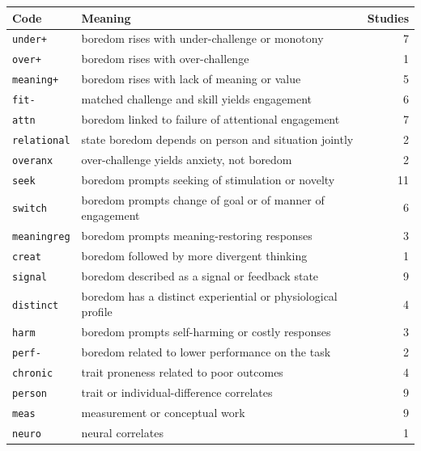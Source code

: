 \begin{center}\small
\begin{tabular}{@{}llr@{}}\toprule
Code & Meaning & Studies \\ \midrule
\texttt{under+} & boredom rises with under-challenge or monotony & 7 \\
\texttt{over+} & boredom rises with over-challenge & 1 \\
\texttt{meaning+} & boredom rises with lack of meaning or value & 5 \\
\texttt{fit-} & matched challenge and skill yields engagement & 6 \\
\texttt{attn} & boredom linked to failure of attentional engagement & 7 \\
\texttt{relational} & state boredom depends on person and situation jointly & 2 \\
\texttt{overanx} & over-challenge yields anxiety, not boredom & 2 \\
\texttt{seek} & boredom prompts seeking of stimulation or novelty & 11 \\
\texttt{switch} & boredom prompts change of goal or of manner of engagement & 6 \\
\texttt{meaningreg} & boredom prompts meaning-restoring responses & 3 \\
\texttt{creat} & boredom followed by more divergent thinking & 1 \\
\texttt{signal} & boredom described as a signal or feedback state & 9 \\
\texttt{distinct} & boredom has a distinct experiential or physiological profile & 4 \\
\texttt{harm} & boredom prompts self-harming or costly responses & 3 \\
\texttt{perf-} & boredom related to lower performance on the task & 2 \\
\texttt{chronic} & trait proneness related to poor outcomes & 4 \\
\texttt{person} & trait or individual-difference correlates & 9 \\
\texttt{meas} & measurement or conceptual work & 9 \\
\texttt{neuro} & neural correlates & 1 \\
\bottomrule\end{tabular}\end{center}
